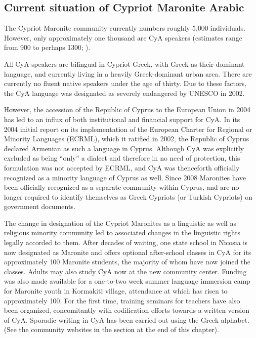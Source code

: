 \documentclass[output=paper]{langsci/langscibook}
\begin{document}
\subsection{Current situation of Cypriot Maronite Arabic}
The Cypriot Maronite community currently numbers roughly 5,000 individuals. However, only approximately one thousand are CyA speakers (estimates range from 900 to perhaps 1300; \citealt{CouncilofEurope2017}).

All CyA speakers are bilingual in Cypriot Greek, with Greek as their dominant language, and currently living in a heavily Greek-dominant urban area. There are currently no fluent native speakers under the age of thirty. Due to these factors, the CyA language was designated as severely endangered by UNESCO in 2002. 

However, the accession of the Republic of Cyprus to the European Union in 2004 has led to an influx of both institutional and financial support for CyA. In its 2004 initial report on its implementation of the European Charter for Regional or Minority Languages (ECRML), which it ratified in 2002, the Republic of Cyprus declared Armenian as such a language in Cyprus. Although CyA was explicitly excluded as being “only” a dialect and therefore in no need of protection, this formulation was not accepted by ECRML, and CyA was thenceforth officially recognized as a minority language of Cyprus as well. Since 2008 Maronites have been officially recognized as a separate community within Cyprus, and are no longer required to identify themselves as Greek Cypriots (or Turkish Cypriots) on government documents.

The change in designation of the Cypriot Maronites as a linguistic as well as religious minority community led to associated changes in the linguistic rights legally accorded to them. After decades of waiting, one state school in Nicosia is now designated as Maronite and offers optional after-school classes in CyA for its approximately 100 Maronite students, the majority of whom have now joined the classes. Adults may also study CyA now at the new community center. Funding was also made available for a one-to-two week summer language immersion camp for Maronite youth in Kormakiti village, attendance at which has risen to approximately 100. For the first time, training seminars for teachers have also been organized, concomitantly with codification efforts towards a written version of CyA. Sporadic writing in CyA has been carried out using the Greek alphabet. (See the community websites in the  section at the end of this chapter). 
\end{document}
